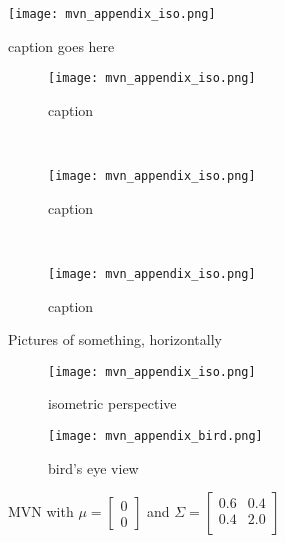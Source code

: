 \begin{figure}[hpbt]
	\centering
	\texttt{[image: mvn\_appendix\_iso.png]}
	\caption{caption goes here}
	\label{fig:some_nice_label_for_this_image}
\end{figure}



\begin{figure}[hptb]
        \centering
        \begin{subfigure}[b]{0.3\textwidth}
                \texttt{[image: mvn\_appendix\_iso.png]}
                \caption{caption}
                \label{fig:gull}
        \end{subfigure}%
        ~ %
        \begin{subfigure}[b]{0.3\textwidth}
                \texttt{[image: mvn\_appendix\_iso.png]}
                \caption{caption}
                \label{fig:tiger}
        \end{subfigure}
        ~ %
        \begin{subfigure}[b]{0.3\textwidth}
                \texttt{[image: mvn\_appendix\_iso.png]}
                \caption{caption}
                \label{fig:mouse}
        \end{subfigure}
        \caption{Pictures of something, horizontally}\label{fig:horizont}
\end{figure}



\begin{figure}[hptb]
	\centering
	\begin{subfigure}[t]{10cm}
		\centering
		\texttt{[image: mvn\_appendix\_iso.png]} 
		\caption{isometric perspective}
		\label{fig:app_mvn:iso}
	\end{subfigure}
	\begin{subfigure}[b]{\textwidth}
		\centering
		\texttt{[image: mvn\_appendix\_bird.png]} 
		\caption{bird's eye view}
		\label{fig:app_mvn_bird}
	\end{subfigure}
	\caption[Multivariate Normal Distribution]{MVN with $\mu = \left[  
		\begin{array}{c} 
			0 \\ 
			0 
		\end{array} \right] $
		 and  $ \Sigma = \left[  
		\begin{array}{cc}
			0.6 & 0.4 \\ 
			0.4 & 2.0 \\
		\end{array} \right] $ }
	\label{fig:app_mvn}
\end{figure}







